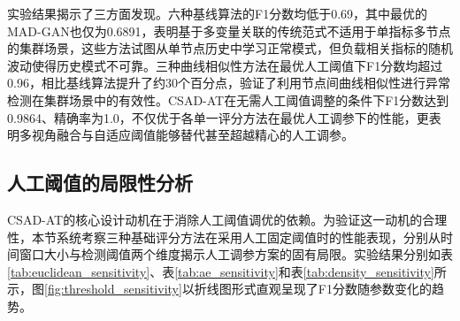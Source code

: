 \documentclass[10.5pt,a4paper,twocolumn]{ctexart}
\newcommand{\bicaption}[2]{%
  \caption{#1\\{\small #2}}%
}
\begin{document}
实验结果揭示了三方面发现。六种基线算法的F1分数均低于0.69，其中最优的MAD-GAN也仅为0.6891，表明基于多变量关联的传统范式不适用于单指标多节点的集群场景，这些方法试图从单节点历史中学习正常模式，但负载相关指标的随机波动使得历史模式不可靠。三种曲线相似性方法在最优人工阈值下F1分数均超过0.96，相比基线算法提升了约30个百分点，验证了利用节点间曲线相似性进行异常检测在集群场景中的有效性。CSAD-AT在无需人工阈值调整的条件下F1分数达到0.9864、精确率为1.0，不仅优于各单一评分方法在最优人工调参下的性能，更表明多视角融合与自适应阈值能够替代甚至超越精心的人工调参。

\subsection{人工阈值的局限性分析}

CSAD-AT的核心设计动机在于消除人工阈值调优的依赖。为验证这一动机的合理性，本节系统考察三种基础评分方法在采用人工固定阈值时的性能表现，分别从时间窗口大小与检测阈值两个维度揭示人工调参方案的固有局限。实验结果分别如表\ref{tab:euclidean_sensitivity}、表\ref{tab:ae_sensitivity}和表\ref{tab:density_sensitivity}所示，图\ref{fig:threshold_sensitivity}以折线图形式直观呈现了F1分数随参数变化的趋势。

\begin{table}[htbp]
    \centering
    \bicaption{欧氏距离方法的参数敏感性实验结果}{Parameter sensitivity results of Euclidean distance method}
    \label{tab:euclidean_sensitivity}
\end{table}
\end{document}
